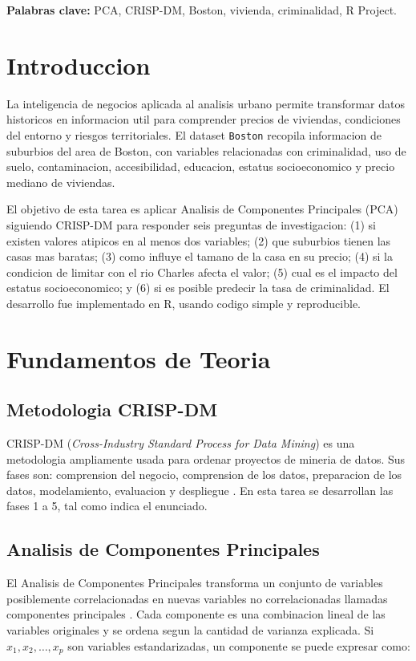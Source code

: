 \documentclass[10pt,a4paper]{article}
\begin{document}
\textbf{Palabras clave:} PCA, CRISP-DM, Boston, vivienda, criminalidad, R Project.

\section{Introduccion}

La inteligencia de negocios aplicada al analisis urbano permite transformar datos historicos en informacion util para comprender precios de viviendas, condiciones del entorno y riesgos territoriales. El dataset \texttt{Boston} recopila informacion de suburbios del area de Boston, con variables relacionadas con criminalidad, uso de suelo, contaminacion, accesibilidad, educacion, estatus socioeconomico y precio mediano de viviendas.

El objetivo de esta tarea es aplicar Analisis de Componentes Principales (PCA) siguiendo CRISP-DM para responder seis preguntas de investigacion: (1) si existen valores atipicos en al menos dos variables; (2) que suburbios tienen las casas mas baratas; (3) como influye el tamano de la casa en su precio; (4) si la condicion de limitar con el rio Charles afecta el valor; (5) cual es el impacto del estatus socioeconomico; y (6) si es posible predecir la tasa de criminalidad. El desarrollo fue implementado en R, usando codigo simple y reproducible.

\section{Fundamentos de Teoria}

\subsection{Metodologia CRISP-DM}

CRISP-DM (\textit{Cross-Industry Standard Process for Data Mining}) es una metodologia ampliamente usada para ordenar proyectos de mineria de datos. Sus fases son: comprension del negocio, comprension de los datos, preparacion de los datos, modelamiento, evaluacion y despliegue \citep{chapman2000}. En esta tarea se desarrollan las fases 1 a 5, tal como indica el enunciado.

\subsection{Analisis de Componentes Principales}

El Analisis de Componentes Principales transforma un conjunto de variables posiblemente correlacionadas en nuevas variables no correlacionadas llamadas componentes principales \citep{jolliffe2002}. Cada componente es una combinacion lineal de las variables originales y se ordena segun la cantidad de varianza explicada. Si $x_1, x_2, \ldots, x_p$ son variables estandarizadas, un componente se puede expresar como:
\end{document}

